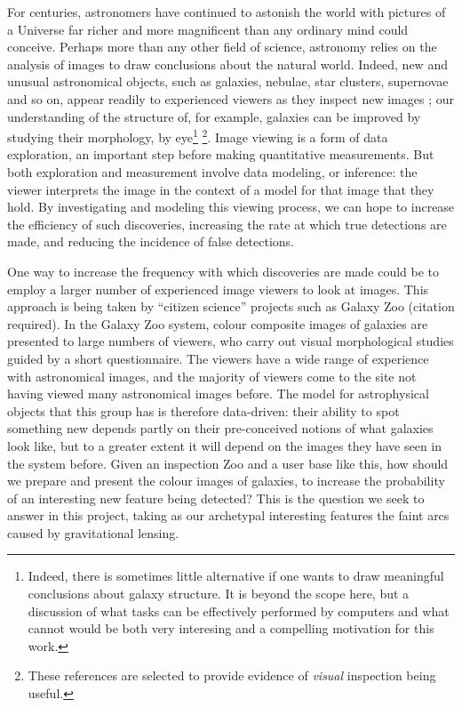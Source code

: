 \documentclass[letterpaper, 11pt]{article}
\begin{document}
For centuries, astronomers have continued to astonish the world with pictures of a Universe far richer and more magnificent than any ordinary mind could conceive. Perhaps more than any other field of science, astronomy relies on the analysis of images to draw conclusions about the natural world. Indeed, new and unusual astronomical objects, such as
galaxies, nebulae, star clusters, supernovae and so on, appear readily to
experienced viewers as they inspect new images \citep[a recent example is the amateur discovery of a quadruple star system, reported in][]{PH12}; our understanding of  the structure of, for example, galaxies can
be improved by studying their morphology, by eye\footnote{Indeed, there is sometimes little alternative if one wants to draw meaningful conclusions about galaxy structure. It is beyond the scope here, but a discussion of what tasks can be effectively performed by computers and what cannot would be both very interesing and a compelling motivation for this work.} \citep[e.g.][]{Lah95, Lah++95, For++11, But11}\footnote{These references are selected to provide evidence of \emph{visual} inspection being useful.}.
Image viewing is a form of data exploration, an important step before making
quantitative measurements. But both exploration and measurement involve data
modeling, or inference: the viewer interprets the image in the context of a
model for that image that they hold.  By investigating and modeling this
viewing process, we can hope to increase the efficiency of such discoveries,
increasing the rate at which true detections are made, and reducing the
incidence of false detections. 

One way to increase the frequency with which discoveries are made  could be to
employ a larger number of experienced image viewers to look at images.  This
approach is being taken by ``citizen science'' projects such as Galaxy Zoo
(citation required). In the Galaxy Zoo system, colour composite
images of galaxies are presented to large numbers of viewers, who carry out
visual morphological studies guided by a short questionnaire. The viewers have
a wide range of experience with astronomical images, and the majority of
viewers come to the site not having viewed many astronomical images before.
The model for astrophysical objects that this group has is therefore
data-driven: their ability to spot something new depends partly on their
pre-conceived notions of what galaxies look like, but to a greater extent it
will depend on the images they have seen in the system before. Given an
inspection Zoo and a user base like this,  how should we prepare and present
the colour images of galaxies, to increase the probability of an interesting
new feature being detected? This is the question we seek to answer in this
project, taking as our archetypal interesting features the faint arcs caused by
gravitational lensing. 
\end{document}
